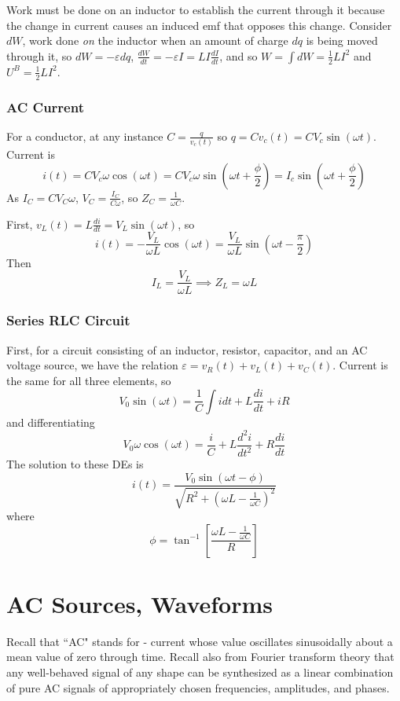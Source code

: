 \documentclass[12pt, a4paper, oneside, openright, titlepage]{book}
\begin{document}
Work must be done on an inductor to establish the current through it because the change in current causes an induced emf that opposes this change. Consider $dW$, work done \emph{on} the inductor when an amount of charge $dq$ is being moved through it, so $dW = -\varepsilon dq$, $\frac{dW}{dt} = -\varepsilon I = LI\frac{dI}{dt}$, and so $W = \int dW = \frac{1}{2}LI^2$ and $U^B = \frac{1}{2}LI^2$.

\subsection{AC Current}

For a conductor, at any instance $C = \frac{q}{v_c(t)}$ so $q = Cv_c(t) = CV_c\sin(\omega t)$. Current is $$i(t) = CV_c\omega \cos(\omega t) = CV_c\omega\sin\left(\omega t + \frac{\phi}{2}\right) = I_c\sin\left(\omega t+\frac{\phi}{2}\right)$$ As $I_C = CV_C\omega$, $V_C = \frac{I_C}{C\omega}$, so $Z_C = \frac{1}{\omega C}$.

First, $v_L(t) = L\frac{di}{dt} = V_L\sin(\omega t)$, so $$i(t) = -\frac{V_L}{\omega L}\cos(\omega t) = \frac{V_L}{\omega L}\sin\left(\omega t -\frac{\pi}{2}\right)$$ Then $$I_L = \frac{V_L}{\omega L}\implies Z_L = \omega L$$

\subsection{Series RLC Circuit}

First, for a circuit consisting of an inductor, resistor, capacitor, and an AC voltage source, we have the relation $\varepsilon = v_R(t) + v_L(t) + v_C(t)$. Current is the same for all three elements, so $$V_0\sin(\omega t) = \frac{1}{C}\int idt + L\frac{di}{dt}+iR$$ and differentiating $$V_0\omega \cos(\omega t) = \frac{i}{C} + L\frac{d^2i}{dt^2} + R\frac{di}{dt}$$ The solution to these DEs is $$i(t) = \frac{V_0\sin(\omega t-\phi)}{\sqrt{R^2 + \left(\omega L - \frac{1}{\omega C}\right)^2}}$$ where $$\phi = \tan^{-1}\left[\frac{\omega L - \frac{1}{\omega C}}{R}\right]$$




\chapter{AC Sources, Waveforms}

Recall that ``AC" stands for  - current whose value oscillates sinusoidally about a mean value of zero through time. Recall also from Fourier transform theory that any well-behaved signal of any shape can be synthesized as a linear combination of pure AC signals of appropriately chosen frequencies, amplitudes, and phases.
\end{document}
